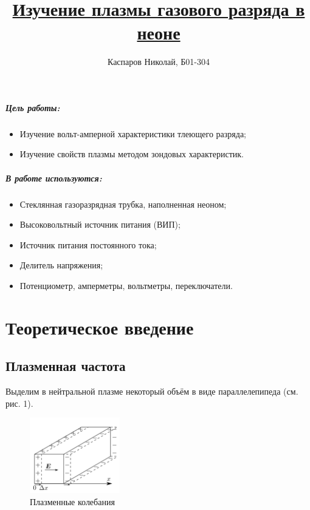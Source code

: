 \documentclass[a4paper]{article}
\title{\underline{Изучение плазмы газового разряда в неоне}}
\author{Каспаров Николай, Б01-304}
\begin{document}
\maketitle
\begin{center}
\Large{\textbf{ }}
\end{center}

\subparagraph{Цель работы:}

\begin{itemize}
\item Изучение вольт-амперной характеристики тлеющего разряда;
\item Изучение свойств плазмы методом зондовых характеристик.
\end{itemize}

\subparagraph{В работе используются:}

\begin{itemize}
\item Стеклянная газоразрядная трубка, наполненная неоном;
\item Высоковольтный источник питания (ВИП);
\item Источник питания постоянного тока;
\item Делитель напряжения;
\item Потенциометр, амперметры, вольтметры, переключатели.
\end{itemize}

\section{Теоретическое введение}

\subsection{Плазменная частота}

Выделим в нейтральной плазме некоторый объём в виде параллелепипеда (см. рис. 1).

\begin{figure}
    \includegraphics[width = 0.35\textwidth]{freq.png}
    \caption[width = 0.95\textwidth]{Плазменные колебания}
\end{figure}
\end{document}
